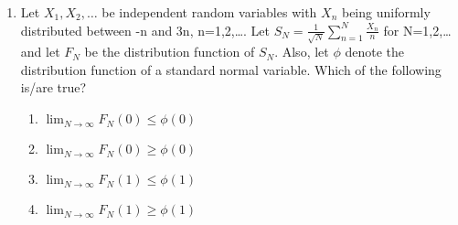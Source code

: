 \renewcommand{\theequation}{\theenumi}
\renewcommand{\thefigure}{\theenumi}
\renewcommand{\thetable}{\theenumi}
\begin{enumerate}[label=\thesection.\arabic*.,ref=\thesection.\theenumi]

\item Let $X_1,X_2,\dots$ be independent random variables with $X_n$ being uniformly distributed between -n and 3n, n=1,2,\dots. 
Let $S_N = \frac{1}{\sqrt{N}} \sum_{n=1}^N \frac{X_n}{n}$ for N=1,2,\dots and let $F_N$ be the distribution function of $S_N$. Also, let $\phi$ denote the distribution function of a standard normal variable. Which of the following is/are true? 
\begin{enumerate}[label=\Alph*)]
    \item $\lim_{N\to\infty} F_N(0)\leq \phi(0)$
    \item $\lim_{N\to\infty} F_N(0)\geq \phi(0)$
    \item $\lim_{N\to\infty} F_N(1)\leq \phi(1)$
    \item $\lim_{N\to\infty} F_N(1)\geq \phi(1)$
\end{enumerate}
\solution



\end{enumerate}
